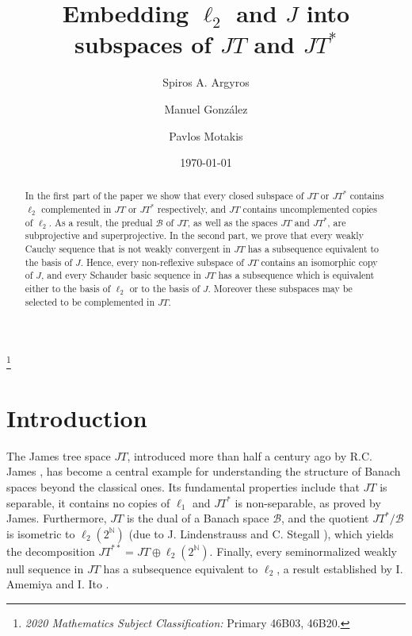 \documentclass[12pt]{amsart}
\theoremstyle{plain}
\numberwithin{equation}{section}
\newcommand{\N}{\mathbb{N}}
\newcommand{\B}{\mathcal{B}}
\begin{document}
\title[Copies of $\ell_2$ and $J$ in $JT$]{Embedding $\ell_2$ and $J$ into subspaces of $JT$ and $JT^*$}

\author{Spiros A. Argyros}
\address{National Technical University of Athens, Faculty of Applied Sciences, Department of Mathematics, Zografou Campus, 157 80, Athens, Greece.}

\author{Manuel Gonz\'alez}
\address{Department of Mathematics, Faculty of Sciences, University of Cantabria, Avenida de los Castros s/n, 39071 Santander, Spain.}

\author{Pavlos Motakis}
\address{Department of Mathematics and Statistics, York University, 4700 Keele Street, Toronto, Ontario, M3J 1P3, Canada}
\thanks{{\em 2020 Mathematics Subject Classification:} Primary 46B03, 46B20.
}

\date{\today}

\begin{abstract}
In the first part of the paper we show that every closed subspace of $JT$ or $JT^*$ contains $\ell_2$ complemented in $JT$ or $JT^*$ respectively, and $JT$ contains uncomplemented copies of $\ell_2$. As a result, the predual $\B$ of $JT$, as well as the spaces $JT$ and $JT^*$, are subprojective and superprojective. In the second part, we prove that every weakly Cauchy sequence that is not weakly convergent in $JT$ has a subsequence equivalent to the basis of $J$. Hence, every non-reflexive subspace of $JT$ contains an isomorphic copy of $J$, and every Schauder basic sequence in $JT$ has a subsequence which is equivalent either to the basis of $\ell_2$ or to the basis of $J$. Moreover these subspaces may be selected  to be complemented in $JT$.
\end{abstract}

\maketitle

\section{Introduction}\label{sect:intro}

The James tree space $JT$, introduced more than half a century ago by R.C. James \cite{James:74}, has become a central example for understanding the structure of Banach spaces beyond the classical ones. Its fundamental properties include  that $JT$  is separable, it contains no copies of $\ell_1$ and $JT^*$ is non-separable, as proved by James. Furthermore, $JT$ is the dual of a Banach space $\B$, and the quotient $JT^*/ \B$ is isometric to $\ell_2 (2^{\N})$ (due to J. Lindenstrauss and C. Stegall \cite{LS}), which yields the decomposition $JT^{**} = JT \oplus \ell_2 (2^{\N})$. Finally, every seminormalized weakly null sequence in $JT$ has a subsequence equivalent to $\ell_2$, a result established by I. Amemiya and I. Ito \cite{AI}.
\end{document}
